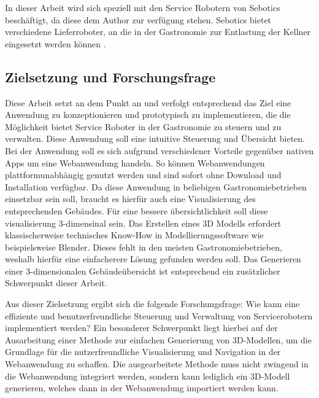 In dieser Arbeit wird sich speziell mit den Service Robotern von Sebotics beschäftigt, da diese dem Author zur verfügung stehen. Sebotics bietet verschiedene Lieferroboter, an die in der Gastronomie zur Entlastung der Kellner eingesetzt werden können \cite{Sebotics2023}.


\subsection{Zielsetzung und Forschungsfrage}
Diese Arbeit setzt an dem Punkt an und verfolgt entsprechend das Ziel eine Anwendung zu konzeptionieren und prototypisch zu implementieren, die die Möglichkeit bietet Service Roboter in der Gastronomie zu steuern und zu verwalten. Diese Anwendung soll eine intuitive Steuerung und Übersicht bieten. Bei der Anwendung soll es sich aufgrund verschiedener Vorteile gegenüber nativen Apps um eine Webanwendung handeln. So können Webanwendungen plattformunabhängig genutzt werden und sind sofort ohne Download und Installation verfügbar. Da diese Anwendung in beliebigen Gastronomiebetrieben einsetzbar sein soll, braucht es hierfür auch eine Visualisierung des entsprechenden Gebäudes. Für eine bessere übersichtlichkeit soll diese visualisierung 3-dimensinal sein. Das Erstellen eines 3D Modells erfordert klassischerweise technisches Know-How in Modellierungssoftware wie beispielsweise Blender. Dieses fehlt in den meisten Gastronomiebetrieben, weshalb hierfür eine einfacherere Lösung gefunden werden soll. Das Generieren einer 3-dimensionalen Gebäudeübersicht ist entsprechend ein zusätzlicher Schwerpunkt dieser Arbeit.

Aus dieser Zielsetzung ergibt sich die folgende Forschungsfrage: Wie kann eine effiziente und benutzerfreundliche Steuerung und Verwaltung von Servicerobotern implementiert werden? Ein besonderer Schwerpunkt liegt hierbei auf der Ausarbeitung einer Methode zur einfachen Generierung von 3D-Modellen, um die Grundlage für die nutzerfreundliche Visualisierung und Navigation in der Webanwendung zu schaffen. Die ausgearbeitete Methode muss nicht zwingend in die Webanwendung integriert werden, sondern kann lediglich ein 3D-Modell generieren, welches dann in der Webanwendung importiert werden kann.

